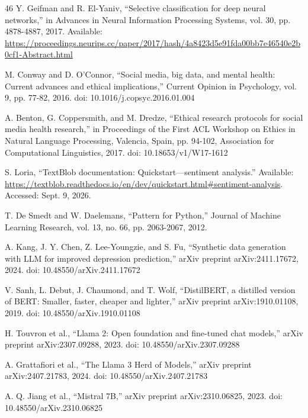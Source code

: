 \documentclass{ieeeaccess}
\begin{document}
\begin{thebibliography}{46}
 Y. Geifman and R. El-Yaniv, ``Selective classification for deep neural networks,'' in Advances in Neural Information Processing Systems, vol. 30, pp. 4878-4887, 2017. Available: \url{https://proceedings.neurips.cc/paper/2017/hash/4a8423d5e91fda00bb7e46540e2b0cf1-Abstract.html}

 M. Conway and D. O'Connor, ``Social media, big data, and mental health: Current advances and ethical implications,'' Current Opinion in Psychology, vol. 9, pp. 77-82, 2016. doi: 10.1016/j.copsyc.2016.01.004

 A. Benton, G. Coppersmith, and M. Dredze, ``Ethical research protocols for social media health research,'' in Proceedings of the First ACL Workshop on Ethics in Natural Language Processing, Valencia, Spain, pp. 94-102, Association for Computational Linguistics, 2017. doi: 10.18653/v1/W17-1612

 S. Loria, ``TextBlob documentation: Quickstart---sentiment analysis.'' Available: \url{https://textblob.readthedocs.io/en/dev/quickstart.html#sentiment-analysis}. Accessed: Sept. 9, 2026.

 T. De Smedt and W. Daelemans, ``Pattern for Python,'' Journal of Machine Learning Research, vol. 13, no. 66, pp. 2063-2067, 2012.

 A. Kang, J. Y. Chen, Z. Lee-Youngzie, and S. Fu, ``Synthetic data generation with LLM for improved depression prediction,'' arXiv preprint arXiv:2411.17672, 2024. doi: 10.48550/arXiv.2411.17672

 V. Sanh, L. Debut, J. Chaumond, and T. Wolf, ``DistilBERT, a distilled version of BERT: Smaller, faster, cheaper and lighter,'' arXiv preprint arXiv:1910.01108, 2019. doi: 10.48550/arXiv.1910.01108

 H. Touvron et al., ``Llama 2: Open foundation and fine-tuned chat models,'' arXiv preprint arXiv:2307.09288, 2023. doi: 10.48550/arXiv.2307.09288

 A. Grattafiori et al., ``The Llama 3 Herd of Models,'' arXiv preprint arXiv:2407.21783, 2024. doi: 10.48550/arXiv.2407.21783

 A. Q. Jiang et al., ``Mistral 7B,'' arXiv preprint arXiv:2310.06825, 2023. doi: 10.48550/arXiv.2310.06825
\end{thebibliography}

\clearpage
\onecolumn
\appendices
\setlength{\medskipamount}{4pt plus 1pt minus 1pt}
\end{document}
